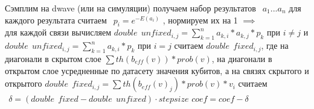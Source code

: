 



Сэмплим на dwave (или на симуляции) \implies получаем набор результатов $\:\:a_1 ... a_n$ \implies для каждого результата считаем $\:\:p_i = e^{-E(a_i)}$ , нормируем их на 1 $\implies$ \\
 для каждой связи вычисляем $double\:\:unfixed_{i, j} = \sum\limits_{k = 1}^{n} a_{k, i} * a_{k, j} * p_k$ при $i \neq j$ и $double\:\:unfixed_{i, j} = \sum\limits_{k = 1}^{n} a_{k, i} * p_k$ при $i = j$ \implies считаем $double\:\:fixed_{i, j}$, где на диагонали в скрытом слое $\sum th(b_{eff}(v)) * prob(v)$, на диагонали в открытом слое усредненные по датасету значения кубитов, а на связях скрытого и открытого $double\:\:fixed_{i, j} = \sum th(b_{eff}(v)_j) * prob(v) * v_i$ \implies считаем   $\:\:\delta = (double\:\:fixed - double\:\:unfixed) \cdot stepsize$ \implies $coef = coef - \delta$


